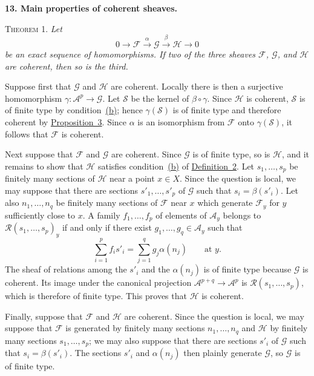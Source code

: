 
\medskip
{}\label{fac:I:2:no:13}
\textbf{13. Main properties of coherent sheaves.}

\label{fac:I:2:no:13:thm:1}
\textsc{Theorem 1.} \textit{Let}
\[
0\longrightarrow\mathcal{F}\xrightarrow{\alpha}\mathcal{G}
\xrightarrow{\beta}\mathcal{H}\longrightarrow 0
\]
\textit{be an exact sequence of homomorphisms. If two of the three sheaves $\mathcal{F}$, $\mathcal{G}$, and $\mathcal{H}$ are coherent, then so is the third.}

Suppose first that $\mathcal{G}$ and $\mathcal{H}$ are coherent. Locally there is then a surjective homomorphism $\gamma:\mathcal{A}^p\to\mathcal{G}$. Let $\mathcal{S}$ be the kernel of $\beta\circ\gamma$. Since $\mathcal{H}$ is coherent, $\mathcal{S}$ is of finite type by condition~\hyperref[fac:I:2:no:12:def:2:item:b]{(b)}; hence $\gamma(\mathcal{S})$ is of finite type and therefore coherent by \hyperref[fac:I:2:no:12:prop:3]{Proposition~3}. Since $\alpha$ is an isomorphism from $\mathcal{F}$ onto $\gamma(\mathcal{S})$, it follows that $\mathcal{F}$ is coherent.

Next suppose that $\mathcal{F}$ and $\mathcal{G}$ are coherent. Since $\mathcal{G}$ is of finite type, so is $\mathcal{H}$, and it remains to show that $\mathcal{H}$ satisfies condition~\hyperref[fac:I:2:no:12:def:2:item:b]{(b)} of \hyperref[fac:I:2:no:12:def:2]{Definition~2}. Let $s_1,\ldots,s_p$ be finitely many sections of $\mathcal{H}$ near a point $x\in X$. Since the question is local, we may suppose that there are sections $s'_1,\ldots,s'_p$ of $\mathcal{G}$ such that $s_i=\beta(s'_i)$. Let also $n_1,\ldots,n_q$ be finitely many sections of $\mathcal{F}$ near $x$ which generate $\mathcal{F}_y$ for $y$ sufficiently close to $x$. A family $f_1,\ldots,f_p$ of elements of $\mathcal{A}_y$ belongs to $\mathcal{R}(s_1,\ldots,s_p)_y$ if and only if there exist $g_1,\ldots,g_q\in\mathcal{A}_y$ such that
\[
\sum_{i=1}^{p}f_i s'_i
=
\sum_{j=1}^{q}g_j\alpha(n_j)
\qquad\text{at }y.
\]
The sheaf of relations among the $s'_i$ and the $\alpha(n_j)$ is of finite type because $\mathcal{G}$ is coherent. Its image under the canonical projection $\mathcal{A}^{p+q}\to\mathcal{A}^p$ is $\mathcal{R}(s_1,\ldots,s_p)$, which is therefore of finite type. This proves that $\mathcal{H}$ is coherent.

Finally, suppose that $\mathcal{F}$ and $\mathcal{H}$ are coherent. Since the question is local, we may suppose that $\mathcal{F}$ is generated by finitely many sections $n_1,\ldots,n_q$ and $\mathcal{H}$ by finitely many sections $s_1,\ldots,s_p$; we may also suppose that there are sections $s'_i$ of $\mathcal{G}$ such that $s_i=\beta(s'_i)$. The sections $s'_i$ and $\alpha(n_j)$ then plainly generate $\mathcal{G}$, so $\mathcal{G}$ is of finite type.

